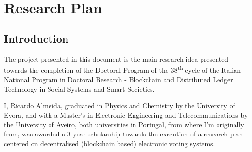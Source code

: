 \documentclass[../main.tex]{subfiles}
\begin{document}
\section{Research Plan}
\label{sec:research_plan}
\subsection{Introduction}
The project presented in this document is the main research idea presented towards the completion of the Doctoral Program of the 38\textsuperscript{th} cycle of the Italian National Program in Doctoral Research - Blockchain and Distributed Ledger Technology in Social Systems and Smart Societies.
\par
I, Ricardo Almeida, graduated in Physics and Chemistry by the University of Evora, and with a Master's in Electronic Engineering and Telecommunications by the University of Aveiro, both universities in Portugal, from where I'm originally from, was awarded a 3 year scholarship towards the execution of a research plan centered on decentralised (blockchain based) electronic voting systems.
\end{document}
